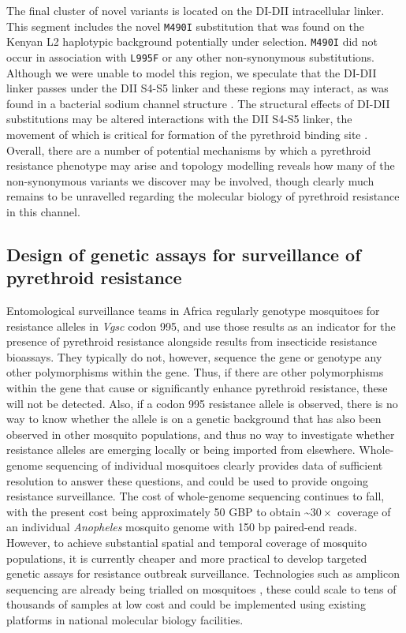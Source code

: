 \documentclass[a4paper,11pt,abstracton,hidelinks]{scrartcl}
\begin{document}
%
The final cluster of novel variants is located on the DI-DII intracellular linker.
%
This segment includes the novel \texttt{M490I} substitution that was found on the Kenyan L2 haplotypic background potentially under selection.
%
\texttt{M490I} did not occur in association with \texttt{L995F} or any other non-synonymous substitutions.
%
Although we were unable to model this region, we speculate that the DI-DII linker passes under the DII S4-S5 linker and these regions may interact, as was found in a bacterial sodium channel structure \cite{Sula2017}.
%
The structural effects of DI-DII substitutions may be altered interactions with the DII S4-S5 linker, the movement of which is critical for formation of the pyrethroid binding site \cite{OReilly2006, Usherwood2007}.
%
Overall, there are a number of potential mechanisms by which a pyrethroid resistance phenotype may arise and topology modelling reveals how many of the non-synonymous variants we discover may be involved, though clearly much remains to be unravelled regarding the molecular biology of pyrethroid resistance in this channel.


\subsection*{Design of genetic assays for surveillance of pyrethroid resistance}

%
Entomological surveillance teams in Africa regularly genotype mosquitoes for resistance alleles in \textit{Vgsc} codon 995, and use those results as an indicator for the presence of pyrethroid resistance alongside results from insecticide resistance bioassays.
%
They typically do not, however, sequence the gene or genotype any other polymorphisms within the gene.
%
Thus, if there are other polymorphisms within the gene that cause or significantly enhance pyrethroid resistance, these will not be detected.
%
Also, if a codon 995 resistance allele is observed, there is no way to know whether the allele is on a genetic background that has also been observed in other mosquito populations, and thus no way to investigate whether resistance alleles are emerging locally or being imported from elsewhere.
%
Whole-genome sequencing of individual mosquitoes clearly provides data of sufficient resolution to answer these questions, and could be used to provide ongoing resistance surveillance.
%
The cost of whole-genome sequencing continues to fall, with the present cost being approximately 50 GBP to obtain \textasciitilde$30\times$ coverage of an individual \emph{Anopheles} mosquito genome with 150 bp paired-end reads.
%
However, to achieve substantial spatial and temporal coverage of mosquito populations, it is currently cheaper and more practical to develop targeted genetic assays for resistance outbreak surveillance.
%
Technologies such as amplicon sequencing \cite{Kilianski2015} are already being trialled on mosquitoes \cite{lucas2019high}, these could scale to tens of thousands of samples at low cost and could be implemented using existing platforms in national molecular biology facilities.
%
\end{document}
